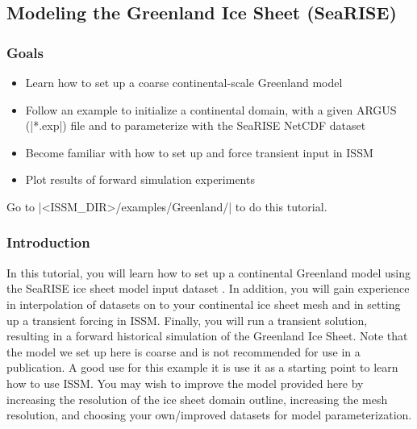 
\subsection{Modeling the Greenland Ice Sheet (SeaRISE)} \label{sec:using-issm-tutorials-greenland}
\subsubsection{Goals} %
\begin{itemize}
	\item Learn how to set up a coarse continental-scale Greenland model
	\item Follow an example to initialize a continental domain, with a given ARGUS (\lstinlinebg|*.exp|) file and to parameterize with the SeaRISE NetCDF dataset
	\item Become familiar with how to set up and force transient input in ISSM
	\item Plot results of forward simulation experiments
\end{itemize}
Go to \lstinlinebg|<ISSM_DIR>/examples/Greenland/| to do this tutorial.

\subsubsection{Introduction}%
In this tutorial, you will learn how to set up a continental Greenland model using the SeaRISE ice sheet model input dataset \citep{Nowicki2013a}. In addition, you will gain experience in interpolation of datasets on to your continental ice sheet mesh and in setting up a transient forcing in ISSM. Finally, you will run a transient solution, resulting in a forward historical simulation of the Greenland Ice Sheet. Note that the model we set up here is coarse and is not recommended for use in a publication. A good use for this example it is use it as a starting point to learn how to use ISSM. You may wish to improve the model provided here by increasing the resolution of the ice sheet domain outline, increasing the mesh resolution, and choosing your own/improved datasets for model parameterization.


